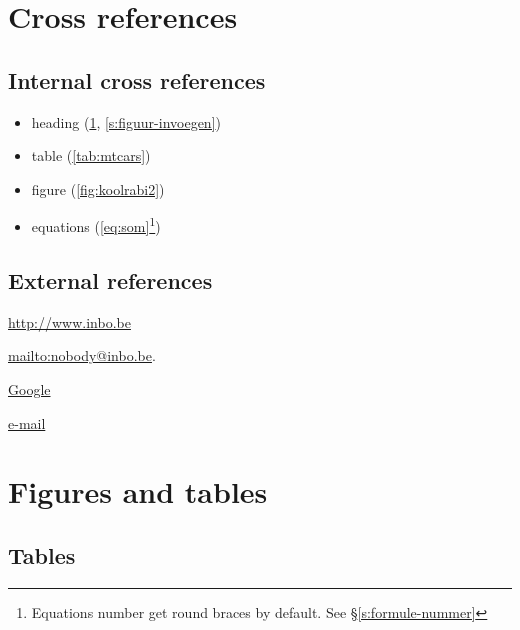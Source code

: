 \documentclass[twoside]{extreport}
\begin{document}
\hypertarget{h:kruisverwijzing}{%
\chapter{Cross references}\label{h:kruisverwijzing}}

\hypertarget{internal-cross-references}{%
\section{Internal cross references}\label{internal-cross-references}}

\begin{itemize}
\tightlist
\item
  heading (\ref{h:kruisverwijzing}, \ref{s:figuur-invoegen})
\item
  table (\ref{tab:mtcars})
\item
  figure (\ref{fig:koolrabi2})
\item
  equations (\eqref{eq:som}\footnote{Equations number get round braces by
    default. See §\ref{s:formule-nummer}})
\end{itemize}

\hypertarget{external-references}{%
\section{External references}\label{external-references}}

\url{http://www.inbo.be}

\url{mailto:nobody@inbo.be}.

\href{http://google.be}{Google}

\href{mailto:nobody@inbo.be}{e-mail}

\hypertarget{figures-and-tables}{%
\chapter{Figures and tables}\label{figures-and-tables}}

\hypertarget{tables}{%
\section{Tables}\label{tables}}
\end{document}
